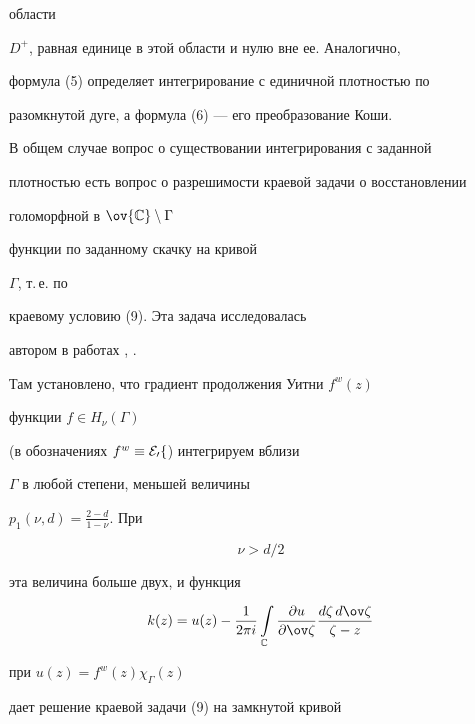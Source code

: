 области 


$D^+$, равная единице в этой области и нулю вне ее. Аналогично, 


формула (5) определяет интегрирование с единичной плотностью по 


разомкнутой дуге, а формула (6) --- его преобразование Коши. 


 


В общем случае вопрос о существовании интегрирования с заданной 


плотностью есть вопрос о разрешимости краевой задачи о восстановлении 


голоморфной в $\ov{\Bbb C}\setminus\Gamma$ 


функции по заданному скачку на кривой 


$\Gamma$, т.\,е. по 


краевому условию (9). Эта задача исследовалась 


автором в работах \cite{16}, \cite{17}. 


 


Там установлено, что градиент продолжения Уитни $f^w(z)$ 


функции $f\in H_\nu(\Gamma)$ 


(в обозначениях \cite{6} $f^w\equiv\cal E_0 f$) интегрируем вблизи 


$\Gamma$ в любой степени, меньшей величины 


$p_1(\nu,d)=\frac{2-d}{1-\nu}$. При 


\begin{equation} 






\nu>d/2


\end{equation} 


эта величина больше двух, и функция 


\begin{equation} 


k(z)=u(z)-\frac{1}{2\pi i} \intl_{\Bbb C}


\myfrac{u}{\ov\zeta}\frac{d\zeta\,d\ov\zeta}{\zeta-z}


\end{equation} 


при $u(z)=f^w(z)\chi_\Gamma(z)$ 


дает решение краевой задачи (9) на замкнутой кривой 


